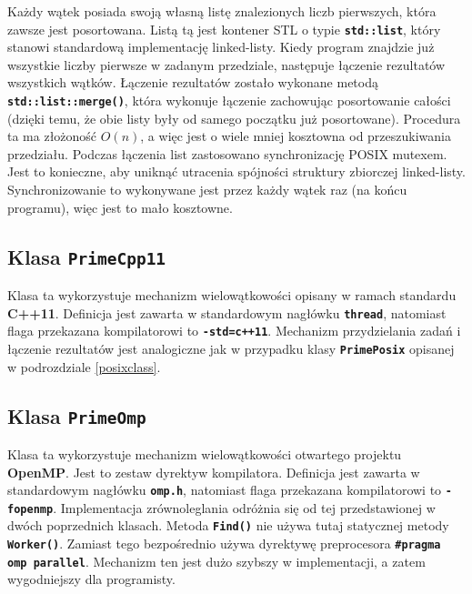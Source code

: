 \documentclass[12pt, twoside, hidelinks, a4paper]{article}
\begin{document}
Każdy wątek posiada swoją własną listę znalezionych liczb pierwszych, która zawsze jest posortowana. Listą tą jest kontener STL o typie \textbf{\texttt{std::list}}, który stanowi  standardową implementację linked-listy. Kiedy program znajdzie już wszystkie liczby pierwsze w zadanym przedziale, następuje łączenie rezultatów wszystkich wątków. Łączenie rezultatów zostało wykonane metodą \textbf{\texttt{std::list::merge()}}, która wykonuje łączenie zachowując posortowanie całości (dzięki temu, że obie listy były od samego początku już posortowane). Procedura ta ma złożoność $O(n)$, a więc jest o wiele mniej kosztowna od przeszukiwania przedziału. Podczas łączenia list zastosowano synchronizację POSIX mutexem. Jest to konieczne, aby uniknąć utracenia spójności struktury zbiorczej linked-listy. Synchronizowanie to wykonywane jest przez każdy wątek raz (na końcu programu), więc jest to mało kosztowne.

\subsection{Klasa \textbf{\texttt{PrimeCpp11}}}
Klasa ta wykorzystuje mechanizm wielowątkowości opisany w ramach standardu \textbf{C++11}. Definicja jest zawarta w standardowym nagłówku \textbf{\texttt{thread}}, natomiast flaga przekazana kompilatorowi to \textbf{\texttt{-std=c++11}}. Mechanizm przydzielania zadań i łączenie rezultatów jest analogiczne jak w przypadku klasy \textbf{\texttt{PrimePosix}} opisanej w podrozdziale \ref{posixclass}.

\subsection{Klasa \textbf{\texttt{PrimeOmp}}}
Klasa ta wykorzystuje mechanizm wielowątkowości otwartego projektu \textbf{OpenMP}. Jest to zestaw dyrektyw kompilatora. Definicja jest zawarta w standardowym nagłówku \textbf{\texttt{omp.h}}, natomiast flaga przekazana kompilatorowi to \textbf{\texttt{-fopenmp}}. Implementacja zrównoleglania odróżnia się od tej przedstawionej w dwóch poprzednich klasach. Metoda \textbf{\texttt{Find()}} nie używa tutaj statycznej metody \textbf{\texttt{Worker()}}. Zamiast tego bezpośrednio używa dyrektywę preprocesora \textbf{\texttt{\#pragma omp parallel}}. Mechanizm ten jest dużo szybszy w implementacji, a zatem wygodniejszy dla programisty.
\end{document}
